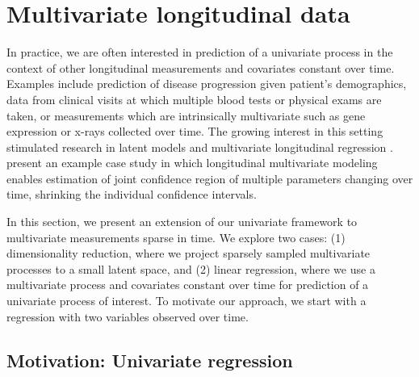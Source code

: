 \documentclass[preprint]{imsart}
\numberwithin{equation}{section}
\theoremstyle{plain}
\begin{document}
\section{Multivariate longitudinal data}\label{s:multivariate}

In practice, we are often interested in prediction of a univariate process in the context of other longitudinal measurements and covariates constant over time. Examples include prediction of disease progression given patient's demographics, data from clinical visits at which multiple blood tests or physical exams are taken, or measurements which are intrinsically multivariate such as gene expression or x-rays collected over time. The growing interest in this setting stimulated research in latent models \citep{sammel1996latent} and multivariate longitudinal regression \citep{gray1998estimating,gray2000multidimensional}. \citet{diggle2002analysis} present an example case study in which longitudinal multivariate modeling enables estimation of joint confidence region of multiple parameters changing over time, shrinking the individual confidence intervals.

In this section, we present an extension of our univariate framework to multivariate measurements sparse in time. We explore two cases: (1) dimensionality reduction, where we project sparsely sampled multivariate processes to a small latent space, and (2) linear regression, where we use a multivariate process and covariates constant over time for prediction of a univariate process of interest. To motivate our approach, we start with a regression with two variables observed over time.


\subsection{Motivation: Univariate regression}
\end{document}
